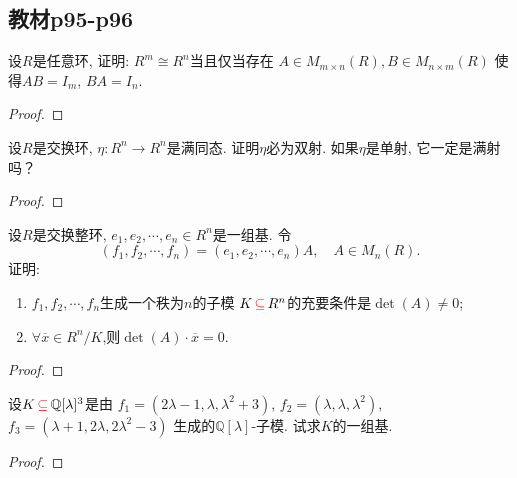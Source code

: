 \subsection{教材p95-p96}

\begin{problem}
    设$R$是任意环, 证明: $R^m \cong R^n$当且仅当存在
$A \in M_{m \times n}(R), B \in M_{n \times m}(R)$
使得$AB = I_m$, $BA = I_{n}$.
\end{problem}

\begin{proof}
    
\end{proof}

\begin{problem}
    设$R$是交换环, $\eta:R^n \to R^n$是满同态.
证明$\eta$必为双射. 如果$\eta$是单射, 它一定是满射吗？
\end{problem}

\begin{proof}
    
\end{proof}

\begin{problem}
    设$R$是交换整环, $e_1, e_2, \cdots, e_n \in R^n$是一组基.
令
\[
    (f_1, f_2, \cdots, f_n) = (e_1, e_2, \cdots, e_n)A,\quad A \in M_n(R).
\]
证明:
\begin{enumerate}[(1)]
    \item $f_1, f_2, \cdots, f_n$生成一个秩为$n$的子模
$K \,\textcolor{red}{\subseteq}\, R^n$的充要条件是$\det(A) \neq 0$;
    \item $\forall \overline{x} \in R^{n}/K$,则$\det(A) \cdot \overline{x} = 0$.
\end{enumerate}
\end{problem}

\begin{proof}
    
\end{proof}

\begin{problem}
    设$K \,\textcolor{red}{\subseteq}\, \mathbb{Q}[\lambda]^3$是由
$f_1 = (2\lambda - 1, \lambda, \lambda^2 + 3)$,
$f_2 = (\lambda, \lambda, \lambda^2)$,
$f_3 = (\lambda + 1, 2\lambda, 2\lambda^2 - 3)$
生成的$\mathbb{Q}[\lambda]$-子模. 试求$K$的一组基.
\end{problem}

\begin{proof}
    
\end{proof}

